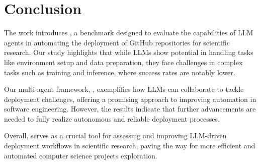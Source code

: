 \section{Conclusion} \label{conclusion}
\vspace{-0.5em}

The work introduces \model, a benchmark designed to evaluate the capabilities of LLM agents in automating the deployment of GitHub repositories for scientific research. Our study highlights that while LLMs show potential in handling tasks like environment setup and data preparation, they face challenges in complex tasks such as training and inference, where success rates are notably lower.

Our multi-agent framework, \agent, exemplifies how LLMs can collaborate to tackle deployment challenges, offering a promising approach to improving automation in software engineering. However, the results indicate that further advancements are needed to fully realize autonomous and reliable deployment processes.

Overall, \model serves as a crucial tool for assessing and improving LLM-driven deployment workflows in scientific research, paving the way for more efficient and automated computer science projects exploration.



